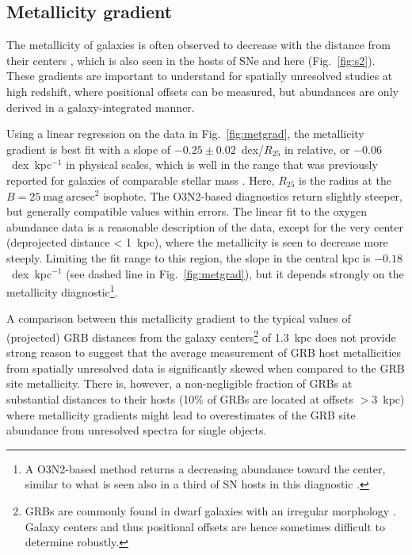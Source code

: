 \documentclass[traditabstract]{aa}
\begin{document}
\subsection{Metallicity gradient}
\label{sec:metgrad}

The metallicity of galaxies is often observed to decrease with the distance from their centers \citep[e.g.,][]{1994ApJ...420...87Z, 2014A&A...563A..49S}, which is also seen in the hosts of SNe \citep{2016A&A...591A..48G} and here (Fig.~\ref{fig:s2}). These gradients are important to understand for spatially unresolved studies at high redshift, where positional offsets can be measured, but abundances are only derived in a galaxy-integrated manner. 

Using a linear regression on the data in Fig.~\ref{fig:metgrad}, the metallicity gradient is best fit with a slope of $-0.25\pm0.02$~dex/$R_{25}$ in relative, or $-0.06$~dex~kpc$^{-1}$ in physical scales, which is well in the range that was previously reported for galaxies of comparable stellar mass \citep{2015MNRAS.448.2030H}. Here, $R_{25}$ is the radius at the $B=25~\mathrm{mag}~\mathrm{arcsec}^2$ isophote. The O3N2-based diagnostics return slightly steeper, but generally compatible values within
errors. The linear fit to the oxygen abundance data is a reasonable description of the data, except for the very center (deprojected distance < 1~kpc), where the metallicity is seen to decrease more steeply. Limiting the fit range to this region, the slope in the central kpc is $-0.18$~dex~kpc$^{-1}$ (see dashed line in Fig.~\ref{fig:metgrad}), but it depends strongly on the metallicity diagnostic\footnote{A O3N2-based method returns a decreasing abundance toward the center, similar to what is seen also in a third of SN hosts in this diagnostic \citep{2016A&A...591A..48G}.}.

A comparison between this metallicity gradient to the typical values of (projected) GRB distances from the galaxy centers\footnote{{GRBs are commonly found in dwarf galaxies with an irregular morphology \citep[e.g.,][]{2006Natur.441..463F, 2017MNRAS.tmp..220L}. Galaxy centers and thus positional offsets are hence sometimes difficult to determine robustly.}} of 1.3~kpc \citep{2016ApJ...817..144B} does not provide strong reason to suggest that the average measurement of GRB host metallicities from spatially unresolved data is significantly skewed when compared to the GRB site metallicity. There is, however, a non-negligible fraction of GRBs at substantial distances to their hosts (10\% of GRBs are located at offsets $>3$~kpc) where metallicity gradients might lead to overestimates of the GRB site abundance from unresolved spectra for single objects.
\end{document}
